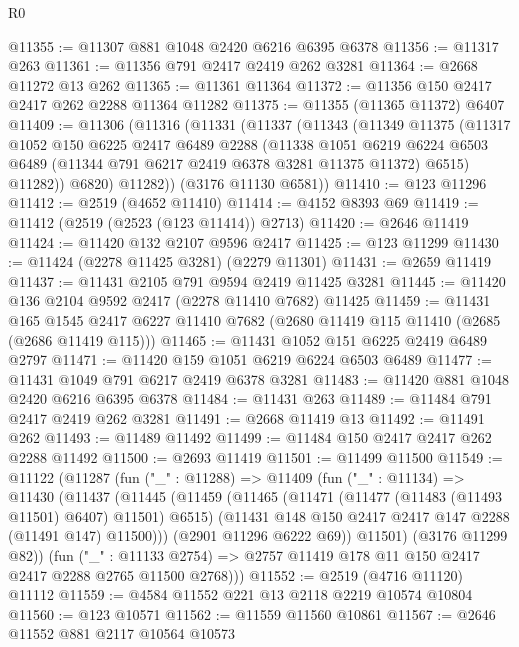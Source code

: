 \begin{lexlean}{R0}
\begin{coremodule}
@11355 := @11307 @881 @1048 @2420 @6216 @6395 @6378
@11356 := @11317 @263
@11361 := @11356 @791 @2417 @2419 @262 @3281
@11364 := @2668 @11272 @13 @262
@11365 := @11361 @11364
@11372 := @11356 @150 @2417 @2417 @262 @2288 @11364 @11282
@11375 := @11355 (@11365 @11372) @6407
@11409 := @11306
    (@11316
      (@11331
        (@11337
          (@11343
            (@11349
              @11375
              (@11317
                @1052
                @150
                @6225
                @2417
                @6489
                @2288
                (@11338
                  @1051
                  @6219
                  @6224
                  @6503
                  @6489
                  (@11344 @791 @6217 @2419 @6378 @3281 @11375 @11372)
                  @6515)
                @11282))
            @6820)
          @11282))
      (@3176 @11130 @6581))
@11410 := @123 @11296
@11412 := @2519 (@4652 @11410)
@11414 := @4152 @8393 @69
@11419 := @11412 (@2519 (@2523 (@123 @11414)) @2713)
@11420 := @2646 @11419
@11424 := @11420 @132 @2107 @9596 @2417
@11425 := @123 @11299
@11430 := @11424 (@2278 @11425 @3281) (@2279 @11301)
@11431 := @2659 @11419
@11437 := @11431 @2105 @791 @9594 @2419 @11425 @3281
@11445 := @11420 @136 @2104 @9592 @2417 (@2278 @11410 @7682) @11425
@11459 := @11431
    @165
    @1545
    @2417
    @6227
    @11410
    @7682
    (@2680 @11419 @115 @11410 (@2685 (@2686 @11419 @115)))
@11465 := @11431 @1052 @151 @6225 @2419 @6489 @2797
@11471 := @11420 @159 @1051 @6219 @6224 @6503 @6489
@11477 := @11431 @1049 @791 @6217 @2419 @6378 @3281
@11483 := @11420 @881 @1048 @2420 @6216 @6395 @6378
@11484 := @11431 @263
@11489 := @11484 @791 @2417 @2419 @262 @3281
@11491 := @2668 @11419 @13
@11492 := @11491 @262
@11493 := @11489 @11492
@11499 := @11484 @150 @2417 @2417 @262 @2288 @11492
@11500 := @2693 @11419
@11501 := @11499 @11500
@11549 := @11122
    (@11287
      (fun ("_" : @11288) =>
      @11409
        (fun ("_" : @11134) =>
        @11430
          (@11437
            (@11445
              (@11459
                (@11465
                  (@11471 (@11477 (@11483 (@11493 @11501) @6407) @11501) @6515)
                  (@11431 @148 @150 @2417 @2417 @147 @2288 (@11491 @147) @11500)))
              (@2901 @11296 @6222 @69))
            @11501)
          (@3176 @11299 @82))
        (fun ("_" : @11133 @2754) =>
        @2757 @11419 @178 @11 @150 @2417 @2417 @2288 @2765 @11500 @2768)))
@11552 := @2519 (@4716 @11120) @11112
@11559 := @4584 @11552 @221 @13 @2118 @2219 @10574 @10804
@11560 := @123 @10571
@11562 := @11559 @11560 @10861
@11567 := @2646 @11552 @881 @2117 @10564 @10573

\end{coremodule}
\end{lexlean}
